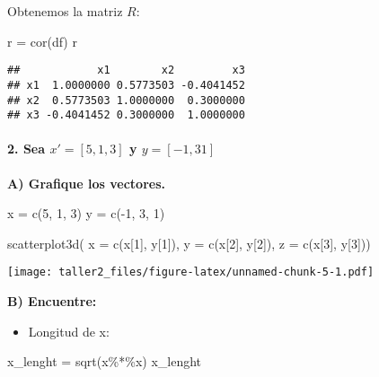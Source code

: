 \documentclass[
]{article}
\newenvironment{Shaded}{\begin{snugshade}}{\end{snugshade}}
\newcommand{\AttributeTok}[1]{\textcolor[rgb]{0.77,0.63,0.00}{#1}}
\newcommand{\DecValTok}[1]{\textcolor[rgb]{0.00,0.00,0.81}{#1}}
\newcommand{\FunctionTok}[1]{\textcolor[rgb]{0.00,0.00,0.00}{#1}}
\newcommand{\NormalTok}[1]{#1}
\newcommand{\OtherTok}[1]{\textcolor[rgb]{0.56,0.35,0.01}{#1}}
\newcommand{\SpecialCharTok}[1]{\textcolor[rgb]{0.00,0.00,0.00}{#1}}
\providecommand{\tightlist}{%
  \setlength{\itemsep}{0pt}\setlength{\parskip}{0pt}}
\begin{document}
Obtenemos la matriz \(R\):

\begin{Shaded}
\begin{Highlighting}[]
\NormalTok{r }\OtherTok{=} \FunctionTok{cor}\NormalTok{(df)}
\NormalTok{r}
\end{Highlighting}
\end{Shaded}

\begin{verbatim}
##            x1        x2         x3
## x1  1.0000000 0.5773503 -0.4041452
## x2  0.5773503 1.0000000  0.3000000
## x3 -0.4041452 0.3000000  1.0000000
\end{verbatim}

\hypertarget{sea-x-5-1-3-y-y--1-3-1}{%
\paragraph{\texorpdfstring{2. Sea \(x' = [5, 1, 3]\) y
\(y = [-1, 3 1]\)}{2. Sea x' = {[}5, 1, 3{]} y y = {[}-1, 3 1{]}}}\label{sea-x-5-1-3-y-y--1-3-1}}

\textbf{A) Grafique los vectores.}

\begin{Shaded}
\begin{Highlighting}[]
\NormalTok{x }\OtherTok{=} \FunctionTok{c}\NormalTok{(}\DecValTok{5}\NormalTok{, }\DecValTok{1}\NormalTok{, }\DecValTok{3}\NormalTok{)}
\NormalTok{y }\OtherTok{=} \FunctionTok{c}\NormalTok{(}\SpecialCharTok{{-}}\DecValTok{1}\NormalTok{, }\DecValTok{3}\NormalTok{, }\DecValTok{1}\NormalTok{)}

\FunctionTok{scatterplot3d}\NormalTok{( }\AttributeTok{x =} \FunctionTok{c}\NormalTok{(x[}\DecValTok{1}\NormalTok{], y[}\DecValTok{1}\NormalTok{]), }\AttributeTok{y =} \FunctionTok{c}\NormalTok{(x[}\DecValTok{2}\NormalTok{], y[}\DecValTok{2}\NormalTok{]), }\AttributeTok{z =} \FunctionTok{c}\NormalTok{(x[}\DecValTok{3}\NormalTok{], y[}\DecValTok{3}\NormalTok{]))}
\end{Highlighting}
\end{Shaded}

\texttt{[image: taller2\_files/figure-latex/unnamed-chunk-5-1.pdf]}

\textbf{B) Encuentre: }

\begin{itemize}
\tightlist
\item
  Longitud de x:
\end{itemize}

\begin{Shaded}
\begin{Highlighting}[]
\NormalTok{x\_lenght }\OtherTok{=} \FunctionTok{sqrt}\NormalTok{(x}\SpecialCharTok{\%*\%}\NormalTok{x)}
\NormalTok{x\_lenght}
\end{Highlighting}
\end{Shaded}
\end{document}
